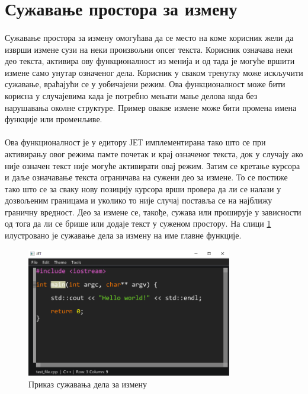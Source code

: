 \documentclass[12pt,oneside]{memoir}
\begin{document}
\section{Сужавање простора за измену}

\paragraph{}
Сужавање простора за измену омогућава да се место на коме корисник жели да изврши
измене сузи на неки произвољни опсег текста. Корисник означава неки део текста,
активира ову функционалност из менија и од тада је могуће вршити измене само
унутар означеног дела. Корисник у сваком тренутку може искључити сужавање, враћајући се у уобичајени режим. Ова функционалност може бити корисна у
случајевима када је потребно мењати мање делова кода без нарушавања околне
структуре. Пример овакве измене може бити промена имена функције или променљиве.


\paragraph{}
Ова функционалност је у едитору ЈЕТ имплементирана тако што се при
активирању овог режима памте почетак и крај означеног текста, док у случају ако није означен текст није могуће активирати овај режим. Затим се кретање курсора
и даље означавање текста ограничава на сужени део за измене. То се постиже тако што се за сваку нову позицију курсора врши провера да ли се налази у дозвољеним границама и уколико то није случај поставља се на најближу граничну вредност. Део за измене се, такође, сужава или проширује у зависности од тога
да ли се брише или додаје текст у суженом простору. На слици
\ref{fig:edit_narrowing} илустровано је сужавање дела за измену на име главне
функције.

\begin{figure}[!ht]
	\centering
	\includegraphics[width=0.8\textwidth]{images/edit_narrowing.png}
	\caption{Приказ сужавања дела за измену}
	\label{fig:edit_narrowing}
\end{figure}
\end{document}
